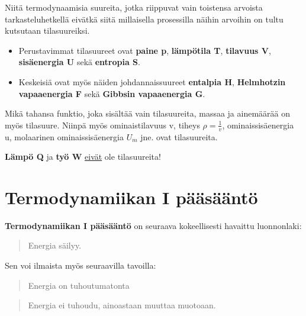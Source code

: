 \documentclass[12pt,a4paper,finnish]{book}
\begin{document}
Niitä termodynaamisia suureita, jotka riippuvat vain toistensa arvoista tarkasteluhetkellä 
eivätkä siitä millaisella prosessilla näihin arvoihin on tultu kutsutaan tilasuureiksi.

\begin{itemize}
 \item Perustavimmat tilasuureet ovat \textbf{paine p}, \textbf{lämpötila T}, 
    \textbf{tilavuus V}, \textbf{sisäenergia U} sekä \textbf{entropia S}.
 \item Keskeisiä ovat myös näiden johdannaissuureet \textbf{entalpia H}, 
  \textbf{Helmhotzin vapaaenergia F} sekä \textbf{Gibbsin vapaaenergia G}.
\end{itemize}

Mikä tahansa funktio, joka sisältää vain tilasuureita, massaa ja ainemäärää on myös tilasuure. 
Niinpä myös ominaistilavuus v, tiheys $\rho = \frac{1}{v}$, ominaissisäenergia u, molaarinen 
ominaissisäenergia $U_m$ jne. ovat tilasuureita.


\textbf{Lämpö Q} ja \textbf{työ W} \underline{eivät} ole tilasuureita!




\chapter{Termodynamiikan I pääsääntö} %

\textbf{Termodynamiikan I pääsääntö} on seuraava kokeellisesti havaittu luonnonlaki:

\begin{quote}
 Energia säilyy.
\end{quote}

Sen voi ilmaista myös seuraavilla tavoilla:

\begin{quote}
 Energia on tuhoutumatonta
\end{quote}

\begin{quote}
 Energia ei tuhoudu, ainoastaan muuttaa muotoaan.
\end{quote}
\end{document}
